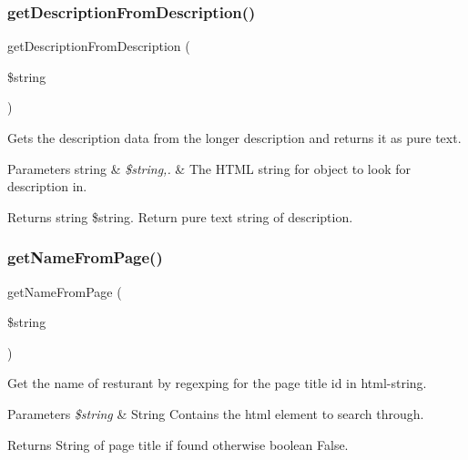 \subsubsection{\texorpdfstring{get\+Description\+From\+Description()}{getDescriptionFromDescription()}}
{\footnotesize\ttfamily get\+Description\+From\+Description (\begin{DoxyParamCaption}\item[{}]{\$string }\end{DoxyParamCaption})}



Gets the description data from the longer description and returns it as pure text. 


\begin{DoxyParams}[1]{Parameters}
string & {\em \$string,.} & The H\+T\+ML string for object to look for description in.\\
\hline
\end{DoxyParams}
\begin{DoxyReturn}{Returns}
string \$string. Return pure text string of description. 
\end{DoxyReturn}
\hypertarget{veganistan_8php_ab4235042caee848a173cb153da0f29be}{}\label{veganistan_8php_ab4235042caee848a173cb153da0f29be} 
\subsubsection{\texorpdfstring{get\+Name\+From\+Page()}{getNameFromPage()}}
{\footnotesize\ttfamily get\+Name\+From\+Page (\begin{DoxyParamCaption}\item[{}]{\$string }\end{DoxyParamCaption})\hspace{0.3cm}{\ttfamily [protected]}}



Get the name of resturant by regexping for the page title id in html-\/string. 


\begin{DoxyParams}{Parameters}
{\em \$string} & String Contains the html element to search through. \\
\hline
\end{DoxyParams}
\begin{DoxyReturn}{Returns}
String of page title if found otherwise boolean False. 
\end{DoxyReturn}
\hypertarget{veganistan_8php_a96e15e817a7a149db3e0b45ce0067e13}{}\label{veganistan_8php_a96e15e817a7a149db3e0b45ce0067e13} 
